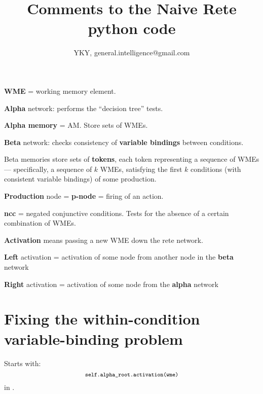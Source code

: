 

\usepackage[CJKspace]{xeCJK}
\usepackage{color}

\usepackage{mathtools}
\usepackage{hyperref}

\title{Comments to the Naive Rete python code}
\author{YKY, general.intelligence@gmail.com}


\maketitle

\textbf{WME} = working memory element.

\textbf{Alpha} network: performs the ``decision tree'' tests.

\textbf{Alpha memory} = AM.  Store sets of WMEs.

\textbf{Beta} network: checks consistency of \textbf{variable bindings} between conditions.

Beta memories store sets of \textbf{tokens}, each token representing a sequence of WMEs --- specifically, a sequence of $k$ WMEs, satisfying the first $k$ conditions (with consistent variable bindings) of some production.

\textbf{Production} node = \textbf{p-node} = firing of an action.

\textbf{ncc} = negated conjunctive conditions.  Tests for the absence of a certain combination of WMEs.

\textbf{Activation} means passing a new WME down the rete network.

\textbf{Left} activation = activation of some node from another node in the \textbf{beta} network

\textbf{Right} activation = activation of some node from the \textbf{alpha} network

\section{Fixing the within-condition variable-binding problem}

Starts with:
\begin{equation}
{\footnotesize
\verb! self.alpha_root.activation(wme) !
}
\end{equation}
in .



